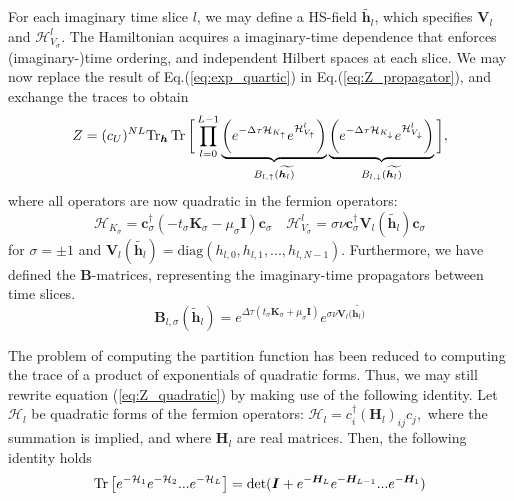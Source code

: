 For each imaginary time slice $l$, we may define a HS-field $\widetilde{\bm h_l}$, which specifies $\bm V_l$ and $\mathcal{H}_{V_\sigma}^l$.
The Hamiltonian acquires a  imaginary-time dependence that enforces (imaginary-)time ordering, and independent Hilbert spaces at each slice.
We may now replace the result of Eq.(\ref{eq:exp_quartic}) in Eq.(\ref{eq:Z_propagator}), and exchange the traces to obtain
\begin{equation}\label{eq:Z_quadratic}
Z  = (c_U)^{NL} \text{Tr}_{\bm h} \operatorname{Tr} \bigg[ \prod_{l=0}^{L-1} \underbrace{\bigg( e^{-\Delta\tau  \mathcal{H}_{K_\uparrow}} e^{\mathcal{H}_{V_\uparrow}^l} \bigg)}_{B_{l, \uparrow}(\widetilde{\bm h_l)}} \underbrace{\bigg( e^{-\Delta\tau  \mathcal{H}_{K_\downarrow}} e^{\mathcal{H}_{V_\downarrow}^l} \bigg)}_{B_{l, \downarrow}(\widetilde{\bm h_l)}} \bigg] ,
\end{equation}
where all operators are now quadratic in the fermion operators:
\begin{equation}
\mathcal{H}_{K_\sigma} = \bm c_\sigma^\dagger ( - t_\sigma \bm K_\sigma -\mu_\sigma \bm I ) \bm c_\sigma \quad \mathcal{H}_{V_\sigma}^l = \sigma \nu \bm c_\sigma^\dagger \bm V_l (\widetilde{\bm h_l}) \bm c_\sigma
\end{equation}
for $\sigma = \pm 1$ and $\bm V_l ( \widetilde{\bm h_l} ) = \text{diag} ( h_{l, 0} , h_{l, 1}, ... , h_{l, N-1} )$.
Furthermore, we have defined the $\bm B$-matrices, representing the imaginary-time propagators between time slices.
\begin{equation}
\bm B_{l, \sigma} ( \widetilde{\bm h}_l ) = e^{\Delta \tau ( t_\sigma \bm K_\sigma + \mu_\sigma \bm I)} e^{\sigma \nu \bm V_l (\widetilde{\bm h_l)}}
\end{equation}

The problem of computing the partition function has been reduced to computing the trace of a product of exponentials of quadratic forms.
Thus, we may still rewrite equation (\ref{eq:Z_quadratic}) by making use of the following identity.
Let $\mathcal{H}_l$ be quadratic forms of the fermion operators: 
$
\mathcal{H}_l = c_i^\dagger (\bm H_l)_{ij} c_j,
$
 where the summation is implied, and where $\bm H_l$ are real matrices.
Then, the following identity holds
\begin{equation}\label{eq:quadraticIdentity}
\operatorname{Tr} \big[ e^{-\mathcal{H}_1 } e^{-\mathcal{H}_2 } ... e^{-\mathcal{H}_L } \big] = \text{det} ( \bm I + e^{-\bm H_L} e^{-\bm H_{L-1}} ... e^{-\bm H_1} )
\end{equation}

